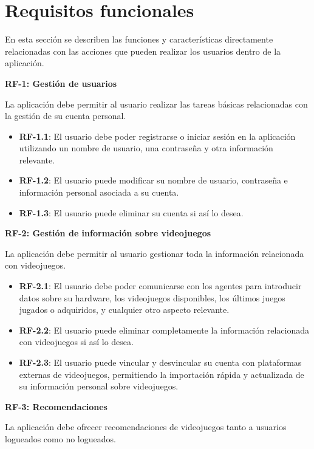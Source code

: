 \newpage
\section{Requisitos funcionales}

En esta sección se describen las funciones y características directamente relacionadas con las acciones que pueden realizar los usuarios dentro de la aplicación.

\textbf{RF-1: Gestión de usuarios}

La aplicación debe permitir al usuario realizar las tareas básicas relacionadas con la gestión de su cuenta personal.

\begin{itemize}
    \item \textbf{RF-1.1}: El usuario debe poder registrarse o iniciar sesión en la aplicación utilizando un nombre de usuario, una contraseña y otra información relevante.
    \item \textbf{RF-1.2}: El usuario puede modificar su nombre de usuario, contraseña e información personal asociada a su cuenta.
    \item \textbf{RF-1.3}: El usuario puede eliminar su cuenta si así lo desea.
\end{itemize}

\textbf{RF-2: Gestión de información sobre videojuegos}

La aplicación debe permitir al usuario gestionar toda la información relacionada con videojuegos.

\begin{itemize}
    \item \textbf{RF-2.1}: El usuario debe poder comunicarse con los agentes para introducir datos sobre su hardware, los videojuegos disponibles, los últimos juegos jugados o adquiridos, y cualquier otro aspecto relevante.
    \item \textbf{RF-2.2}: El usuario puede eliminar completamente la información relacionada con videojuegos si así lo desea.
    \item \textbf{RF-2.3}: El usuario puede vincular y desvincular su cuenta con plataformas externas de videojuegos, permitiendo la importación rápida y actualizada de su información personal sobre videojuegos.
\end{itemize}

\textbf{RF-3: Recomendaciones}

La aplicación debe ofrecer recomendaciones de videojuegos tanto a usuarios logueados como no logueados.

